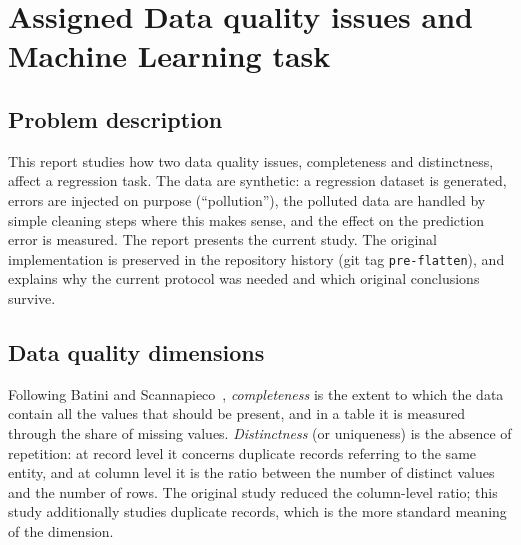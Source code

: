 \documentclass{Configuration_Files/PoliMi3i_thesis}
\begin{document}
\mainmatter %


\lstset{language=SQL, style=mystyle}


\chapter{Assigned Data quality issues and Machine Learning task}
\label{ch:chapter_1}%

\section{Problem description}
\label{sec:section_1_1}%
This report studies how two data quality issues, completeness and distinctness, affect a regression task. The data are synthetic: a regression dataset is generated, errors are injected on purpose (``pollution''), the polluted data are handled by simple cleaning steps where this makes sense, and the effect on the prediction error is measured. The report presents the current study. The original implementation is preserved in the repository history (git tag \texttt{pre-flatten}), and  explains why the current protocol was needed and which original conclusions survive.

\section{Data quality dimensions}
\label{sec:dimensions}%
Following Batini and Scannapieco~\cite{batini2016}, \emph{completeness} is the extent to which the data contain all the values that should be present, and in a table it is measured through the share of missing values. \emph{Distinctness} (or uniqueness) is the absence of repetition: at record level it concerns duplicate records referring to the same entity, and at column level it is the ratio between the number of distinct values and the number of rows. The original study reduced the column-level ratio; this study additionally studies duplicate records, which is the more standard meaning of the dimension.
\end{document}
